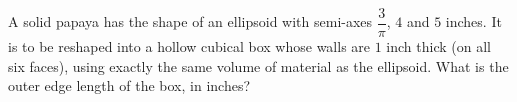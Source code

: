 A solid papaya has the shape of an ellipsoid with semi-axes $\dfrac{3}{\pi}$, $4$ and $5$ inches. It is to be reshaped into a hollow cubical box whose walls are $1$ inch thick (on all six faces), using exactly the same volume of material as the ellipsoid. What is the outer edge length of the box, in inches?
